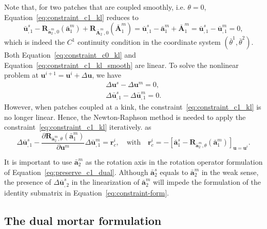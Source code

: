 Note that, for two patches that are coupled smoothly, i.e. $\theta=0$, Equation~\eqref{eq:constraint_c1_kl} reduces to
\begin{equation}
	\bar{\mathbf{u}}^s_{,1} - \mathbf{R}_{\bar{\mathbf{a}}^m_2,0}(\bar{\mathbf{a}}^m_1) + \mathbf{R}_{\bar{\mathbf{A}}^m_2,0}(\bar{\mathbf{A}}^m_1) = \bar{\mathbf{u}}^s_{,1} - \bar{\mathbf{a}}^m_1 + \bar{\mathbf{A}}^m_1 = \bar{\mathbf{u}}^s_{,1} - \bar{\mathbf{u}}^m_{,1} = 0,\label{eq:constraint_c1_kl_smooth}
\end{equation}
which is indeed the $C^1$ continuity condition in the coordinate system $(\bar{\theta}^1, \bar{\theta}^2)$. Both Equation~\eqref{eq:constraint_c0_kl} and Equation~\eqref{eq:constraint_c1_kl_smooth} are linear. To solve the nonlinear problem at $\mathbf{u}^{i+1} = \mathbf{u}^{i} +{\Delta} \mathbf{u}$, we have
\begin{subequations}
	\begin{align}
		\Delta\mathbf{u}^s-\Delta\mathbf{u}^m=0, \\
		\Delta\bar{\mathbf{u}}^s_{,1} - \Delta\bar{\mathbf{u}}^m_{,1} = 0.
	\end{align}
\end{subequations}
However, when patches coupled at a kink, the constraint~\eqref{eq:constraint_c1_kl} is no longer linear. Hence, the Newton-Raphson method is needed to apply the constraint~\eqref{eq:constraint_c1_kl} iteratively. as
\begin{equation}
	\Delta\bar{\mathbf{u}}^s_{,1}-\frac{\partial \mathbf{R}_{\bar{\mathbf{a}}^m_2,\theta}(\bar{\mathbf{a}}^m_1)}{\partial \mathbf{u}^m}\Delta\bar{\mathbf{u}}^m_{,1} = \mathbf{r}_c^i,\quad\text{with}\quad \mathbf{r}_c^i = -\left[\bar{\mathbf{a}}^s_1 - \mathbf{R}_{\bar{\mathbf{a}}^m_2,\theta}(\bar{\mathbf{a}}^m_1)\right]_{\mathbf{u}=\mathbf{u}^{i}}.
\end{equation}

\begin{remark}
	It is important to use $\bar{\mathbf{a}}^m_2$ as the rotation axis in the rotation operator formulation of Equation~\eqref{eq:preserve_c1_dual}. Although $\bar{\mathbf{a}}^s_2$ equals to $\bar{\mathbf{a}}^m_2$ in the weak sense, the presence of $\Delta\bar{\mathbf{u}}^s_{,2}$ in the linearization of $\bar{\mathbf{a}}^m_2$ will impede the formulation of the identity submatrix in Equation~\eqref{eq:constraint-form}.
\end{remark}

\subsection{The dual mortar formulation}

